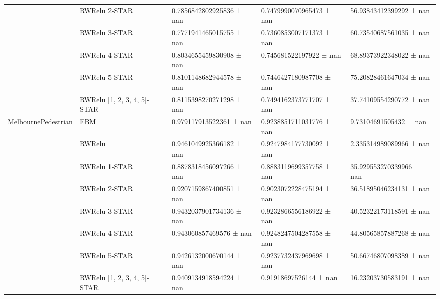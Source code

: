 \begin{tabular}{lllll}
 & RWRelu 2-STAR & 0.7856842802925836 ± nan & 0.7479990070965473 ± nan & 56.93843412399292 ± nan \\
 & RWRelu 3-STAR & 0.7771941465015755 ± nan & 0.7360853007171373 ± nan & 60.73540687561035 ± nan \\
 & RWRelu 4-STAR & 0.8034655459830908 ± nan & 0.745681522197922 ± nan & 68.89373922348022 ± nan \\
 & RWRelu 5-STAR & 0.8101148682944578 ± nan & 0.7446427180987708 ± nan & 75.20828461647034 ± nan \\
 & RWRelu [1, 2, 3, 4, 5]-STAR & 0.8115398270271298 ± nan & 0.7494162373771707 ± nan & 37.74109554290772 ± nan \\
\cline{1-5}
\multirow[t]{8}{*}{MelbournePedestrian} & EBM & 0.979117913522361 ± nan & 0.9238851711031776 ± nan & 9.73104691505432 ± nan \\
 & RWRelu & 0.9461049925366182 ± nan & 0.9247984177730092 ± nan & 2.335314989089966 ± nan \\
 & RWRelu 1-STAR & 0.8878318456097266 ± nan & 0.8883119699357758 ± nan & 35.929553270339966 ± nan \\
 & RWRelu 2-STAR & 0.9207159867400851 ± nan & 0.9023072228475194 ± nan & 36.51895046234131 ± nan \\
 & RWRelu 3-STAR & 0.9432037901734136 ± nan & 0.9232866556186922 ± nan & 40.52322173118591 ± nan \\
 & RWRelu 4-STAR & 0.943060857469576 ± nan & 0.9248247504287558 ± nan & 44.80565857887268 ± nan \\
 & RWRelu 5-STAR & 0.9426132000670144 ± nan & 0.9237732437969698 ± nan & 50.66746807098389 ± nan \\
 & RWRelu [1, 2, 3, 4, 5]-STAR & 0.9409134918594224 ± nan & 0.91918697526144 ± nan & 16.23203730583191 ± nan \\
\cline{1-5}
\bottomrule
\end{tabular}

